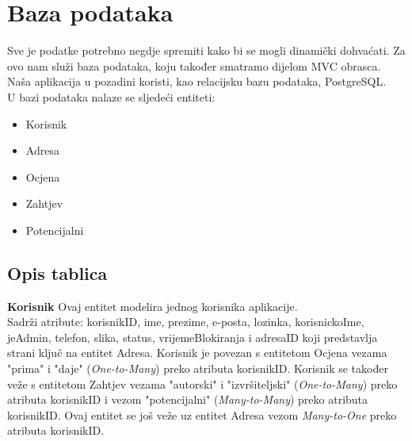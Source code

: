 			
			
			\section{Baza podataka}
			
			Sve je podatke potrebno negdje spremiti kako bi se mogli dinamički dohvaćati. Za ovo nam služi baza podataka, koju također smatramo dijelom MVC obrasca. Naša aplikacija u pozadini koristi, kao relacijsku bazu podataka, PostgreSQL.
			\\
			U bazi podataka nalaze se sljedeći entiteti:
			\begin{itemize}
				\item Korisnik
				\item Adresa
				\item Ocjena
				\item Zahtjev
				\item Potencijalni
			\end{itemize}
			
			\subsection{Opis tablica}
			
			
			\textbf{Korisnik} Ovaj entitet modelira jednog korisnika aplikacije.\\
			Sadrži atribute: korisnikID, ime, prezime, e-posta, lozinka, korisnickoIme, jeAdmin, telefon, slika, status, vrijemeBlokiranja i
			adresaID koji predstavlja strani ključ na entitet Adresa. Korisnik je povezan s entitetom Ocjena vezama "prima" i "daje" (\textit{One-to-Many}) preko atributa korisnikID. Korisnik se također veže s entitetom Zahtjev vezama "autorski" i "izvršiteljski" (\textit{One-to-Many}) preko atributa korisnikID i vezom "potencijalni" (\textit{Many-to-Many}) preko atributa korisnikID. Ovaj entitet se još veže uz entitet Adresa vezom \textit{Many-to-One} preko atributa korisnikID.
			

